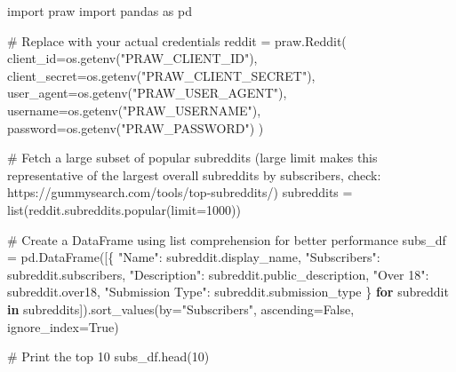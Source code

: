 \documentclass[
  12pt,
  letterpaper,
  DIV=11,
  numbers=noendperiod]{scrartcl}
\newenvironment{Shaded}{\begin{snugshade}}{\end{snugshade}}
\newcommand{\BuiltInTok}[1]{\textcolor[rgb]{0.00,0.23,0.31}{#1}}
\newcommand{\CommentTok}[1]{\textcolor[rgb]{0.37,0.37,0.37}{#1}}
\newcommand{\ControlFlowTok}[1]{\textcolor[rgb]{0.00,0.23,0.31}{\textbf{#1}}}
\newcommand{\DecValTok}[1]{\textcolor[rgb]{0.68,0.00,0.00}{#1}}
\newcommand{\ImportTok}[1]{\textcolor[rgb]{0.00,0.46,0.62}{#1}}
\newcommand{\KeywordTok}[1]{\textcolor[rgb]{0.00,0.23,0.31}{\textbf{#1}}}
\newcommand{\NormalTok}[1]{\textcolor[rgb]{0.00,0.23,0.31}{#1}}
\newcommand{\OperatorTok}[1]{\textcolor[rgb]{0.37,0.37,0.37}{#1}}
\newcommand{\StringTok}[1]{\textcolor[rgb]{0.13,0.47,0.30}{#1}}
\newcommand{\VariableTok}[1]{\textcolor[rgb]{0.07,0.07,0.07}{#1}}
\begin{document}
\begin{Shaded}
\begin{Highlighting}[]
\ImportTok{import}\NormalTok{ praw}
\ImportTok{import}\NormalTok{ pandas }\ImportTok{as}\NormalTok{ pd}

\CommentTok{\# Replace with your actual credentials}
\NormalTok{reddit }\OperatorTok{=}\NormalTok{ praw.Reddit(}
\NormalTok{    client\_id}\OperatorTok{=}\NormalTok{os.getenv(}\StringTok{"PRAW\_CLIENT\_ID"}\NormalTok{),}
\NormalTok{    client\_secret}\OperatorTok{=}\NormalTok{os.getenv(}\StringTok{"PRAW\_CLIENT\_SECRET"}\NormalTok{),}
\NormalTok{    user\_agent}\OperatorTok{=}\NormalTok{os.getenv(}\StringTok{"PRAW\_USER\_AGENT"}\NormalTok{),}
\NormalTok{    username}\OperatorTok{=}\NormalTok{os.getenv(}\StringTok{"PRAW\_USERNAME"}\NormalTok{),}
\NormalTok{    password}\OperatorTok{=}\NormalTok{os.getenv(}\StringTok{"PRAW\_PASSWORD"}\NormalTok{)}
\NormalTok{)}

\CommentTok{\# Fetch a large subset of popular subreddits (large limit makes this representative of the largest overall subreddits by subscribers, check: https://gummysearch.com/tools/top{-}subreddits/)}
\NormalTok{subreddits }\OperatorTok{=} \BuiltInTok{list}\NormalTok{(reddit.subreddits.popular(limit}\OperatorTok{=}\DecValTok{1000}\NormalTok{))}

\CommentTok{\# Create a DataFrame using list comprehension for better performance}
\NormalTok{subs\_df }\OperatorTok{=}\NormalTok{ pd.DataFrame([\{}
    \StringTok{"Name"}\NormalTok{: subreddit.display\_name,}
    \StringTok{"Subscribers"}\NormalTok{: subreddit.subscribers,}
    \StringTok{"Description"}\NormalTok{: subreddit.public\_description,}
    \StringTok{"Over 18"}\NormalTok{: subreddit.over18,}
    \StringTok{"Submission Type"}\NormalTok{: subreddit.submission\_type}
\NormalTok{\} }\ControlFlowTok{for}\NormalTok{ subreddit }\KeywordTok{in}\NormalTok{ subreddits]).sort\_values(by}\OperatorTok{=}\StringTok{"Subscribers"}\NormalTok{, ascending}\OperatorTok{=}\VariableTok{False}\NormalTok{, ignore\_index}\OperatorTok{=}\VariableTok{True}\NormalTok{)}

\CommentTok{\# Print the top 10}
\NormalTok{subs\_df.head(}\DecValTok{10}\NormalTok{)}
\end{Highlighting}
\end{Shaded}
\end{document}
